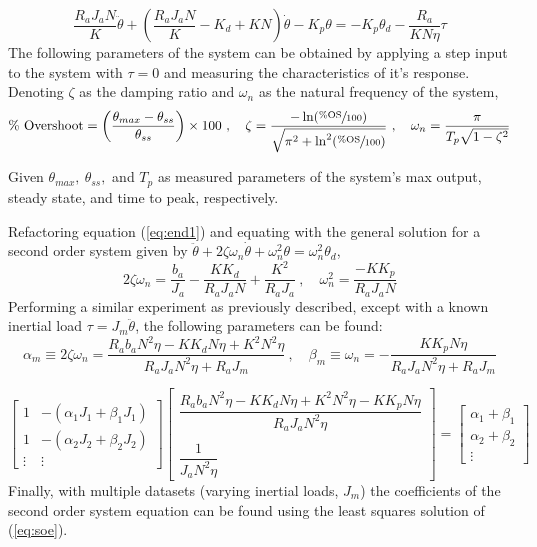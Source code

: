 \documentclass[12pt]{report}
\begin{document}
\begin{equation}
  \frac{R_aJ_aN}{K}\ddot{\theta} + \left( \frac{R_aJ_aN}{K} - K_d + KN \right)\dot{\theta} - K_p\theta = -K_p\theta_d - \frac{R_a}{KN\eta}\tau
  \label{eq:end1}
\end{equation}
\newpage
The following parameters of the system can be obtained by applying a step input to the system with $\tau=0$ and measuring the characteristics of it's response. Denoting $\zeta$ as the damping ratio and $\omega_n$ as the natural frequency of the system,
\[
  \text{\% Overshoot} = \left( \frac{\theta_{max} - \theta_{ss}}{\theta_{ss}} \right) \times 100~,\quad \zeta = \frac{-\ln(\sfrac{\%\text{OS}}{100})}{\sqrt{\pi^2 + \ln^2(\sfrac{\%\text{OS}}{100})}}~,\quad \omega_n = \frac{\pi}{T_p\sqrt{1-\zeta^2}}
\]

Given $\theta_{max},~\theta_{ss},$ and $T_p$ as measured parameters of the system's max output, steady state, and time to peak, respectively.

Refactoring equation (\ref{eq:end1}) and equating with the general solution for a second order system given by $\ddot{\theta} + 2\zeta\omega_n\dot{\theta} + \omega_n^2\theta = \omega_n^2\theta_d$,
\begin{equation}
  2\zeta\omega_n = \frac{b_a}{J_a} - \frac{KK_d}{R_aJ_aN} + \frac{K^2}{R_aJ_a}~,\quad
  \omega_n^2 = \frac{-KK_p}{R_aJ_aN}
\end{equation}
Performing a similar experiment as previously described, except with a known inertial load $\tau = J_m\ddot{\theta}$, the following parameters can be found:
\begin{equation}
  \alpha_m \equiv 2\zeta\omega_n = \frac{R_ab_aN^2\eta-KK_dN\eta+K^2N^2\eta}{R_aJ_aN^2\eta+R_aJ_m}~,\quad
  \beta_m \equiv \omega_n =-\frac{KK_pN\eta}{R_aJ_aN^2\eta+R_aJ_m}
\end{equation}

\begin{equation}
\begin{bmatrix}
  1 & -(\alpha_1J_1+\beta_1J_1) \\
  1 & -(\alpha_2J_2+\beta_2J_2) \\
  \vdots & \vdots
\end{bmatrix}
\begin{bmatrix}
  \dfrac{R_ab_aN^2\eta-KK_dN\eta+K^2N^2\eta-KK_pN\eta}{R_aJ_aN^2\eta} \\
  ~\\
  \dfrac{1}{J_aN^2\eta}
\end{bmatrix}
=
\begin{bmatrix}
  \alpha_1+\beta_1 \\
  \alpha_2+\beta_2 \\
  \vdots
\end{bmatrix}
\label{eq:soe}
\end{equation}
Finally, with multiple datasets (varying inertial loads, $J_m$) the coefficients of the second order system equation can be found using the least squares solution of (\ref{eq:soe}).
\end{document}
